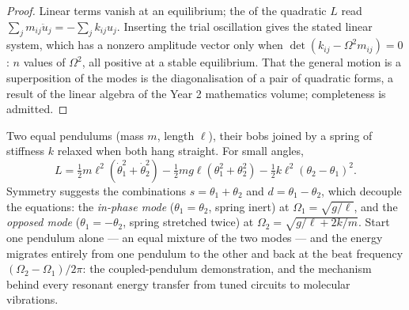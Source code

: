 \begin{proof}
Linear terms vanish at an equilibrium; the  of
the quadratic $L$ read $\sum_jm_{ij}\ddot u_j = -\sum_jk_{ij}u_j$.
Inserting the trial oscillation gives the stated linear system, which
has a nonzero amplitude vector only when $\det(k_{ij} -
\Omega^2m_{ij}) = 0$: $n$ values of $\Omega^2$, all positive at a
stable equilibrium. That the general motion is a superposition of the
modes is the diagonalisation of a pair of quadratic forms, a result of
the linear algebra of the Year 2 mathematics volume; completeness is
admitted.
\end{proof}

\begin{example}\label{ex:b3:lagrangian-mechanics:coupled}
Two equal pendulums (mass $m$, length $\ell$), their bobs joined by a
spring of stiffness $k$ relaxed when both hang straight. For small
angles,
\[
L = \tfrac12 m\ell^2(\dot\theta_1^2 + \dot\theta_2^2)
 - \tfrac12 mg\ell(\theta_1^2 + \theta_2^2)
 - \tfrac12 k\ell^2(\theta_2 - \theta_1)^2 .
\]
Symmetry suggests the combinations $s = \theta_1 + \theta_2$ and $d =
\theta_1 - \theta_2$, which decouple the equations: the \emph{in-phase
mode} ($\theta_1 = \theta_2$, spring inert) at $\Omega_1 =
\sqrt{g/\ell}$, and the \emph{opposed mode} ($\theta_1 = -\theta_2$,
spring stretched twice) at $\Omega_2 = \sqrt{g/\ell + 2k/m}$. Start one
pendulum alone --- an equal mixture of the two modes --- and the energy
migrates entirely from one pendulum to the other and back at the beat
frequency $(\Omega_2 - \Omega_1)/2\pi$: the coupled-pendulum
demonstration, and the mechanism behind every resonant energy transfer
from tuned circuits to molecular vibrations.
\end{example}

